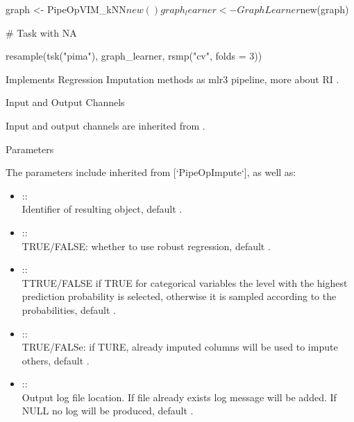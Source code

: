 \documentclass[letterpaper]{book}
\begin{document}
%
\begin{Examples}
\begin{ExampleCode}
{
  graph <- PipeOpVIM_kNN$new() %
  graph_learner <- GraphLearner$new(graph)

  # Task with NA

  resample(tsk("pima"), graph_learner, rsmp("cv", folds = 3))
}
\end{ExampleCode}
\end{Examples}
%
\begin{Description}\relax
Implements Regression Imputation methods as mlr3 pipeline, more about RI .
\end{Description}
%
\begin{Section}{Input and Output Channels}

Input and output channels are inherited from .
\end{Section}
%
\begin{Section}{Parameters}

The parameters include inherited from [`PipeOpImpute`], as well as: \\{}
\begin{itemize}

\item{}  :: \\{}
Identifier of resulting object, default .
\item{}  :: \\{}
TRUE/FALSE: whether to use robust regression, default .
\item{}  :: \\{}
TTRUE/FALSE if TRUE for categorical variables the level with the highest prediction probability is selected, otherwise it is sampled according to the probabilities, default .
\item{}  :: \\{}
TRUE/FALSe: if TURE, already imputed columns will be used to impute others, default .
\item{}  :: \\{}
Output log file location. If file already exists log message will be added. If NULL no log will be produced, default .

\end{itemize}

\end{Section}
\end{document}
